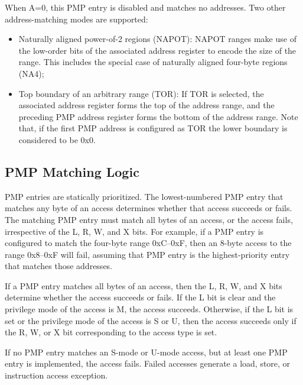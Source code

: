 When A=0, this PMP entry is disabled and matches no addresses. Two other address-matching
modes are supported:
\begin{itemize}
  \item Naturally aligned power-of-2 regions (NAPOT): NAPOT ranges make use of
    the low-order bits of the associated address register to encode the size of
    the range. This includes the special case of naturally aligned four-byte regions
    (NA4);

  \item Top boundary of an arbitrary range (TOR): If TOR is selected, the associated
    address register forms the top of the address range, and the preceding PMP
    address register forms the bottom of the address range. Note that, if the
    first PMP address is configured as TOR the lower boundary is considered to
    be 0x0.
\end{itemize}

\subsection{PMP Matching Logic}
\label{subsec:matchinglogic}

PMP entries are statically prioritized. The lowest-numbered PMP entry that
matches any byte of an access determines whether that access succeeds or fails. The
matching PMP entry must match all bytes of an access, or the access fails, irrespective
of the L, R, W, and X bits. For example, if a PMP entry is configured to match
the four-byte range 0xC–0xF, then an 8-byte access to the range 0x8–0xF will fail,
assuming that PMP entry is the highest-priority entry that matches those
addresses.

If a PMP entry matches all bytes of an access, then the L, R, W, and X bits
determine whether the access succeeds or fails. If the L bit is clear and the privilege
mode of the access is M, the access succeeds. Otherwise, if the L bit is set or
the privilege mode of the access is S or U, then the access succeeds only if the
R, W, or X bit corresponding to the access type is set.

If no PMP entry matches an S-mode or U-mode access, but at least one PMP entry
is implemented, the access fails. Failed accesses generate a load, store, or
instruction access exception.